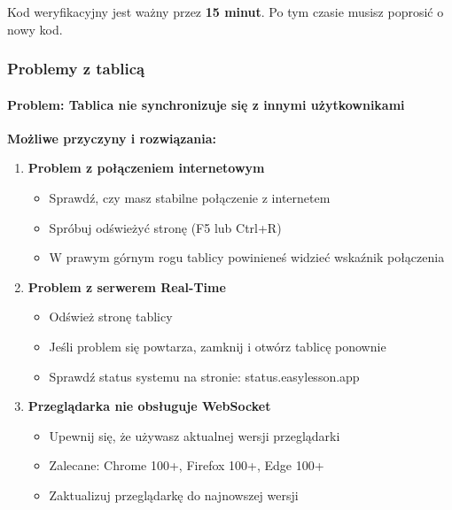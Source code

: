 \documentclass[12pt,a4paper]{article}
\begin{document}
\begin{tcolorbox}[colback=yellow!10!white,colframe=orange!75!black,title=\faExclamationTriangle\ Uwaga]
Kod weryfikacyjny jest ważny przez \textbf{15 minut}. Po tym czasie musisz poprosić o nowy kod.
\end{tcolorbox}

\subsubsection{Problemy z tablicą}

\paragraph{Problem: Tablica nie synchronizuje się z innymi użytkownikami}

\textbf{Możliwe przyczyny i rozwiązania:}

\begin{enumerate}
    \item \textbf{Problem z połączeniem internetowym}
    \begin{itemize}
        \item Sprawdź, czy masz stabilne połączenie z internetem
        \item Spróbuj odświeżyć stronę (F5 lub Ctrl+R)
        \item W prawym górnym rogu tablicy powinieneś widzieć wskaźnik połączenia
    \end{itemize}
    
    \item \textbf{Problem z serwerem Real-Time}
    \begin{itemize}
        \item Odśwież stronę tablicy
        \item Jeśli problem się powtarza, zamknij i otwórz tablicę ponownie
        \item Sprawdź status systemu na stronie: status.easylesson.app
    \end{itemize}
    
    \item \textbf{Przeglądarka nie obsługuje WebSocket}
    \begin{itemize}
        \item Upewnij się, że używasz aktualnej wersji przeglądarki
        \item Zalecane: Chrome 100+, Firefox 100+, Edge 100+
        \item Zaktualizuj przeglądarkę do najnowszej wersji
    \end{itemize}
\end{enumerate}
\end{document}
